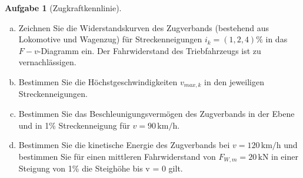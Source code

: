 \documentclass[10pt,a4paper,headsepline,smallheadings]{scrartcl}
\theoremstyle{definition}
\newtheorem{aufgabe}{Aufgabe}
\begin{document}
\begin{aufgabe}[Zugkraftkennlinie]
\begin{enumerate}[a)]
\item Zeichnen Sie die Widerstandskurven des Zugverbands (bestehend aus Lokomotive und Wagenzug) f\"ur Streckenneigungen $i_{k} = (1, 2, 4) \%$ in das $F-v$-Diagramm ein. Der Fahrwiderstand des Triebfahrzeugs ist zu vernachl\"assigen.
\item Bestimmen Sie die H\"ochstgeschwindigkeiten $v_{max, k}$ in den jeweiligen Streckenneigungen.
\item Bestimmen Sie das Beschleunigungsverm\"ogen des Zugverbands in der Ebene und in 1\% Streckenneigung f\"ur $v = 90\, \mathrm{km/h}$.
\item Bestimmen Sie die kinetische Energie des Zugverbands bei $v = 120 \, \mathrm{km/h}$ und bestimmen Sie f\"ur einen mittleren Fahrwiderstand von $F_{W,m} =20 \, \mathrm{kN}$ in einer Steigung von 1\% die Steigh\"ohe bis v = 0 gilt.
\end{enumerate}
\end{aufgabe}
\end{document}
